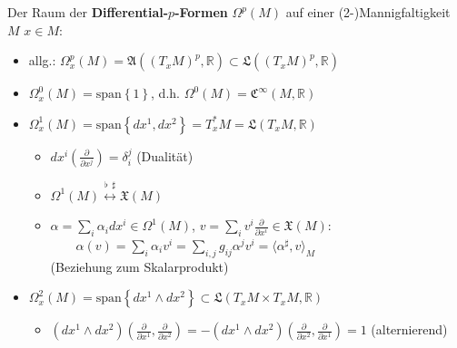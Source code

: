 \documentclass[handout]{beamer}
\newcommand{\R}{\mathds{R}}
\begin{document}
  \begin{frame}
    \begin{block}{Der Raum der \textbf{Differential-\( p \)-Formen} \( \Omega^{p}(M) \) auf einer (2-)Mannigfaltigkeit \( M \)}
      \( x \in M \):
      \begin{itemize}
        \item allg.: \(\Omega^{p}_{x}(M) = \mathfrak{A}(\left( T_{x}M \right)^{p}, \R) \subset \mathfrak{L}(\left( T_{x}M \right)^{p}, \R) \)
        \item<2-> \( \Omega^{0}_{x}(M) = \text{span}\left\{ 1 \right\} \), d.h. \( \Omega^{0}(M) = \mathfrak{C}^{\infty}(M, \R)\)
        \item<3-> \( \Omega^{1}_{x}(M) = \text{span}\left\{ dx^{1}, dx^{2} \right\} = T_{x}^{*}M = \mathfrak{L}(T_{x}M, \R) \) 
        \begin{itemize}
          \item \( dx^{i}\left(\frac{\partial}{\partial x^{j}}\right) = \delta_{i}^{j} \) (Dualität)
          \item \(\Omega^{1}(M) \overset{\flat\ \ \sharp}{\longleftrightarrow} \mathfrak{X}(M)\)
          \item  \( \alpha = \sum_{i}\alpha_{i}dx^{i} \in \Omega^{1}(M) \), \( v = \sum_{i}v^{i}\frac{\partial}{\partial x^{i}} \in \mathfrak{X}(M)  \):\\
              \( \qquad \alpha(v) = \sum_{i}\alpha_{i}v^{i} = \sum_{i,j}g_{ij}\alpha^{j}v^{i} = \langle \alpha^{\sharp}, v \rangle_{M} \)\\
              (Beziehung zum Skalarprodukt)
        \end{itemize}
        \item<4-> \( \Omega^{2}_{x}(M) = \text{span}\left\{ dx^{1} \wedge dx^{2}\right\} \subset \mathfrak{L}(T_{x}M \times T_{x}M, \R) \)
        \begin{itemize}
          \item \( \left(dx^{1}\wedge dx^{2}\right) \left(\frac{\partial}{\partial x^{1}}, \frac{\partial}{\partial x^{2}}\right)
              = -\left(dx^{1}\wedge dx^{2}\right) \left(\frac{\partial}{\partial x^{2}}, \frac{\partial}{\partial x^{1}}\right) = 1 \)
              (alternierend)
        \end{itemize}
      \end{itemize}
    \end{block}
  \end{frame}
\end{document}
